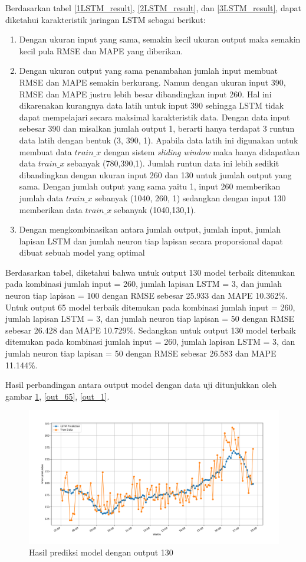 \documentclass[conference]{IEEEtran}
\begin{document}
Berdasarkan tabel \ref{1LSTM_result}, \ref{2LSTM_result}, dan \ref{3LSTM_result}, dapat diketahui karakteristik jaringan LSTM sebagai berikut:
\begin{enumerate}
	\item Dengan ukuran input yang sama, semakin kecil ukuran output maka semakin kecil pula RMSE dan MAPE yang diberikan. 
	\item Dengan ukuran output yang sama penambahan jumlah input membuat RMSE dan MAPE semakin berkurang. Namun dengan ukuran input 390, RMSE dan MAPE justru lebih besar dibandingkan input 260. Hal ini dikarenakan kurangnya data latih untuk input 390 sehingga LSTM tidak dapat mempelajari secara maksimal karakteristik data. Dengan data input sebesar 390  dan misalkan jumlah output 1, berarti hanya terdapat 3 runtun data latih dengan bentuk (3, 390, 1). Apabila data latih ini digunakan untuk membuat data $train\_x$ dengan sistem \textit{sliding window} maka hanya didapatkan data $train\_x$ sebanyak (780,390,1). Jumlah runtun data ini lebih sedikit dibandingkan dengan ukuran input 260 dan 130 untuk jumlah output yang sama. Dengan jumlah output yang sama yaitu 1, input 260 memberikan jumlah data $train\_x$ sebanyak (1040, 260, 1) sedangkan dengan input 130 memberikan data $train\_x$ sebanyak (1040,130,1).
	\item Dengan mengkombinasikan antara jumlah output, jumlah input, jumlah lapisan LSTM dan jumlah neuron tiap lapisan secara proporsional dapat dibuat sebuah model yang optimal  
\end{enumerate}

Berdasarkan tabel, diketahui bahwa untuk output 130 model terbaik ditemukan pada kombinasi jumlah input = 260, jumlah lapisan LSTM = 3, dan jumlah neuron tiap lapisan = 100 dengan RMSE sebesar 25.933 dan MAPE 10.362\%. Untuk output 65 model terbaik ditemukan pada kombinasi jumlah input = 260, jumlah lapisan LSTM = 3, dan jumlah neuron tiap lapisan = 50 dengan RMSE sebesar 26.428 dan MAPE 10.729\%.
Sedangkan untuk output 130 model terbaik ditemukan pada kombinasi jumlah input = 260, jumlah lapisan LSTM = 3, dan jumlah neuron tiap lapisan = 50 dengan RMSE sebesar 26.583 dan MAPE 11.144\%.

Hasil perbandingan antara output model dengan data uji ditunjukkan oleh gambar \ref{out_130}, \ref{out_65}, \ref{out_1}.
\begin{figure}[htp]
	\centering
	\includegraphics[scale=0.3]{out_130}
	\caption{Hasil prediksi model dengan output 130}
	\label{out_130}
\end{figure}
\end{document}

